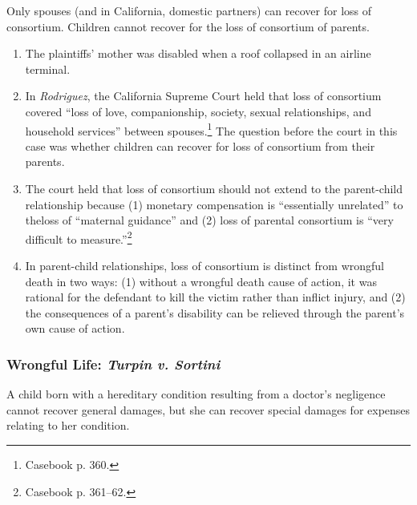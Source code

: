 Only spouses (and in California, domestic partners) can recover for loss of 
consortium. Children cannot recover for the loss of consortium of parents.

\begin{enumerate}
    \item The plaintiffs' mother was disabled when a roof collapsed in an 
    airline terminal.
    \item In \emph{Rodriguez}, the California Supreme Court held that loss of 
    consortium covered ``loss of love, companionship, society, sexual 
    relationships, and household services'' between spouses.\footnote{Casebook 
    p. 360.} The question before the court in this case was whether children 
    can recover for loss of consortium from their parents.
    \item The court held that loss of consortium should not extend to the 
    parent-child relationship because (1) monetary compensation is 
    ``essentially unrelated'' to theloss of ``maternal guidance'' and (2) loss 
    of parental consortium is ``very difficult to measure.''\footnote{Casebook 
    p. 361--62.}
    \item In parent-child relationships, loss of consortium is distinct from 
    wrongful death in two ways: (1) without a wrongful death cause of action, 
    it was rational for the defendant to kill the victim rather than inflict 
    injury, and (2) the consequences of a parent's disability can be relieved 
    through the parent's own cause of action.
\end{enumerate}

\subsubsection{Wrongful Life: \emph{Turpin v. Sortini}}

A child born with a hereditary condition resulting from a doctor's negligence 
cannot recover general damages, but she can recover special damages for 
expenses relating to her condition.

